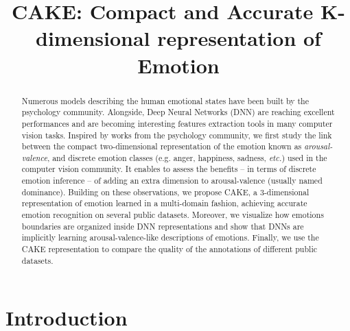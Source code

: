 \documentclass{bmvc2k}
\title{CAKE: Compact and Accurate K-dimensional representation of Emotion}
\begin{document}
\maketitle
\begin{abstract}
Numerous models describing the human emotional states have been built by the psychology community. Alongside, Deep Neural Networks (DNN) are reaching excellent performances and are becoming interesting features extraction tools in many computer vision tasks. 
Inspired by works from the psychology community, we first study the link between the compact two-dimensional representation of the emotion known as {\em arousal-valence},  and discrete emotion classes (e.g. anger, happiness, sadness, \textit{etc.}) used in the computer vision community. It enables to assess the benefits -- in terms of discrete emotion inference -- of adding an extra dimension to arousal-valence (usually named dominance). Building on these observations, we propose CAKE, a 3-dimensional representation of emotion learned in a multi-domain fashion, achieving accurate emotion recognition on several public datasets. Moreover, we visualize how emotions boundaries are organized inside DNN representations and show that DNNs are implicitly learning arousal-valence-like descriptions of emotions. Finally, we use the CAKE representation to compare the quality of the annotations of different public datasets.
\end{abstract}
\section{Introduction}
\begin{figure}
\begin{floatrow}
\end{floatrow}
\end{figure}
\end{document}
